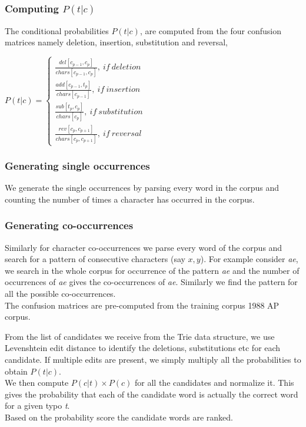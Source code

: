 \documentclass{article}
\begin{document}
				\subsubsection{Computing $P(t|c)$}
					The conditional probabilities $P(t|c)$, are computed from the four confusion matrices namely deletion, insertion, substitution and reversal,
					
					$
					P(t|c) = 
						\left\{	
							\begin{matrix}
								\frac{del[c_{p-1}, c_{p}]}{chars[c_{p-1}, c_{p}]}, \> if \> deletion	\\
								\frac{add[c_{p-1}, t_{p}]}{chars[c_{p-1}]}, \> if \> insertion \\
								\frac{sub[t_{p}, c_{p}]}{chars[c_{p}]}, \> if \> substitution \\
								\frac{rev[c_{p}, c_{p+1}]}{chars[c_{p}, c_{p+1}]}, \> if \> reversal
							\end{matrix}
						\right.
					$
				\subsubsection{Generating single occurrences}
					We generate the single occurrences by parsing every word in the corpus and counting the number of times a character has occurred in the corpus.
				\subsubsection{Generating co-occurrences}
					Similarly for character co-occurrences we parse every word of the corpus and search for a pattern of consecutive characters (say $x, y$). 
For example consider \textit{ae}, we search in the whole corpus for occurrence of the pattern \textit{ae} and the number of occurrences of \textit{ae} gives the co-occurrences of \textit{ae}. Similarly we find the pattern for all the possible co-occurrences. \\
					The confusion matrices are pre-computed from the training corpus 1988 AP corpus.\\

			\medskip
					
			From the list of candidates we receive from the Trie data structure, we use Levenshtein edit distance to identify the deletions, substitutions etc for each candidate. If multiple edits are present, we simply multiply all the probabilities to obtain $P(t|c)$.\\
			We then compute $P(c|t) \times P(c)$ for all the candidates and normalize it. This gives the probability that each of the candidate word is actually the correct word for a given typo \textit{t}.\\
			Based on the probability score the candidate words are ranked.
		
\end{document}
